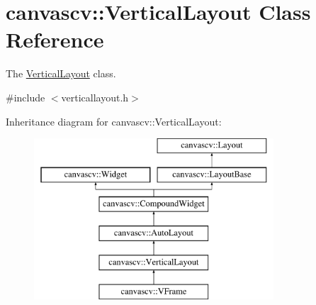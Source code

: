 \hypertarget{classcanvascv_1_1VerticalLayout}{}\section{canvascv\+:\+:Vertical\+Layout Class Reference}
\label{classcanvascv_1_1VerticalLayout}


The \hyperlink{classcanvascv_1_1VerticalLayout}{Vertical\+Layout} class.  




{\ttfamily \#include $<$verticallayout.\+h$>$}

Inheritance diagram for canvascv\+:\+:Vertical\+Layout\+:\begin{figure}[H]
\begin{center}
\leavevmode
\includegraphics[height=6.000000cm]{classcanvascv_1_1VerticalLayout}
\end{center}
\end{figure}
